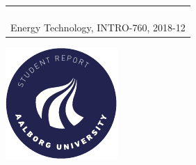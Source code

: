 \begin{titlepage}
{{\begin{tabular}{@{}p{\textwidth}@{}}
\begin{center}
{      }
    \end{center}
   \begin{center}
    {\Large
     Estefanía Ruiz, Aitor Teran, Nicolai Fransen, Jesper Kloster, Thassilo Lang,  Nicolás Murguizur Bustos%
    }\\
    \vspace{0.4cm}
    {\large
      Energy Technology, INTRO-760, 2018-12%
    }
   \end{center}
   \vspace{0.2cm}
   \begin{center}
    {\Large
      Master's Project
    }
   \end{center}
  \end{tabular}}}
  \vfill
  \begin{center}
    \includegraphics[width=0.2\paperwidth]{AAUgraphics/aau_logo_circle_en}%
  \end{center}
\end{titlepage}
\clearpage
